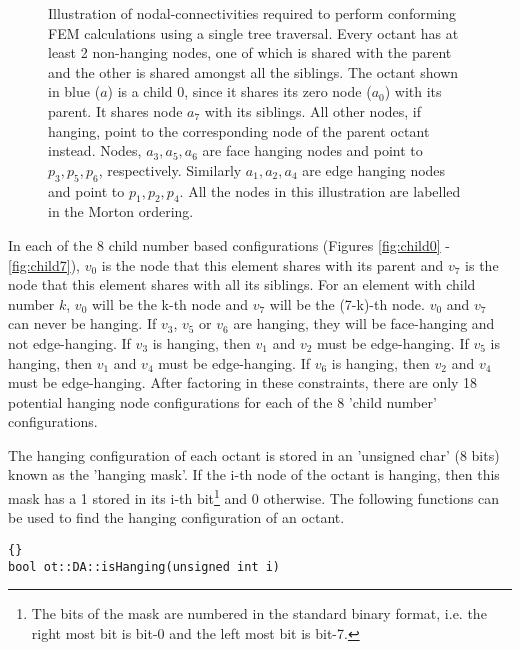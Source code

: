 \documentclass[12pt,reqno,a4paper]{report}
\numberwithin{equation}{section}
\begin{document}
\begin{figure}
  \begin{center} 
   \label{fig:hanging}
   
  \caption{ Illustration of nodal-connectivities required to perform conforming
  FEM calculations using a single tree traversal. Every octant has at least 2 non-hanging nodes, one of which is
  shared with the parent and the other is shared amongst all the
  siblings. The octant shown in blue ($a$) is a child 0, since it shares its zero node
  ($a_0$) with its parent. It shares node $a_7$ with its siblings. All other nodes, if hanging, 
  point to the corresponding node of the parent octant instead. Nodes, $a_3, a_5, a_6$ are face
  hanging nodes and point to $p_3, p_5, p_6$, respectively. Similarly
  $a_1, a_2, a_4$ are edge hanging nodes and point to $p_1, p_2,
  p_4$. All the nodes in this illustration are labelled in the Morton ordering.} 
  \end {center}
\end{figure}

In each of the 8 child number based configurations (Figures \ref{fig:child0} - \ref{fig:child7}), $v_0$ is the node that this element shares with its parent and $v_7$ is the node that this element shares with all its siblings. For an element with child number $k$, $v_0$ will be the k-th node and $v_7$ will be the (7-k)-th node. $v_0$ and $v_7$ can never be hanging. If $v_3$, $v_5$ or $v_6$ are hanging, they will be face-hanging and not edge-hanging. If $v_3$ is hanging, then $v_1$ and $v_2$ must be edge-hanging. If $v_5$ is hanging, then $v_1$ and $v_4$ must be edge-hanging. If $v_6$ is hanging, then $v_2$ and $v_4$ must be edge-hanging. After factoring in these constraints, there are only 18 potential hanging node configurations for each of the 8 'child number' configurations.

The hanging configuration of each octant is stored in an 'unsigned char' (8 bits) known as the 'hanging mask'. If the i-th node of the octant is hanging, then this mask has a 1 stored in its i-th bit\footnote{The bits of the mask are numbered in the standard binary format, i.e. the right most bit is bit-0 and the left most bit is bit-7.} and 0 otherwise. The following functions can be used to find the hanging configuration of an octant.

\begin{lstlisting}[frame=trbl, fontadjust]{}
bool ot::DA::isHanging(unsigned int i)
\end{lstlisting}
\end{document}
